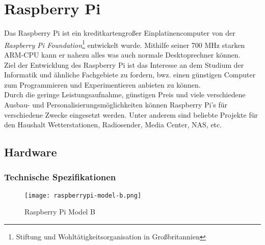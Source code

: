 \chapter{Raspberry Pi}

Das Raspberry Pi ist ein kreditkartengroßer Einplatinencomputer von der \textit{Raspberry Pi Foundation}\footnote{Stiftung und Wohltätigkeitsorganisation in Großbritannien} entwickelt wurde. Mithilfe seiner 700 MHz starken ARM-CPU kann er nahezu alles was auch normale Desktoprechner können.\\
Ziel der Entwicklung des Raspberry Pi ist das Interesse an dem Studium der Informatik und ähnliche Fachgebiete zu fordern, bwz. einen günstigen Computer zum Programmieren und Experimentieren anbieten zu können.\\

Durch die geringe Leistungsaufnahme, günstigen Preis und viele verschiedene Ausbau- und Personalisierungsmöglichkeiten können Raspberry Pi’s für verschiedene Zwecke eingesetzt werden. Unter anderem sind beliebte Projekte für den Haushalt Wetterstationen, Radiosender, Media Center, NAS, etc.



\section{Hardware}
\subsection{Technische Spezifikationen}

\begin{figure}[h]
  \begin{center}		%
    \texttt{[image: raspberrypi-model-b.png]}
  		  \caption{Raspberry Pi Model B}
     \label{raspPic}
  \end{center}
\end{figure}

